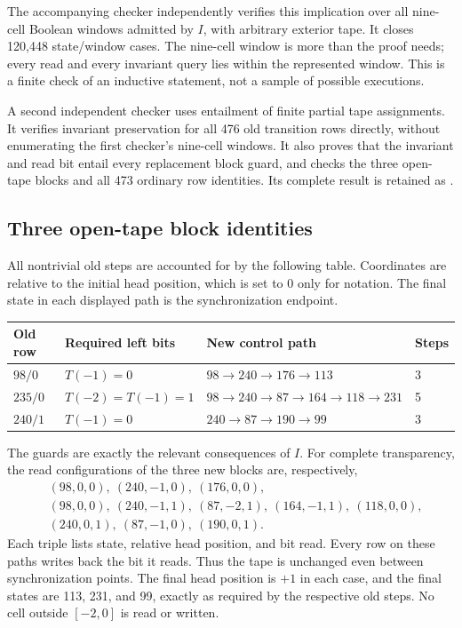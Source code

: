 The accompanying checker independently verifies this implication over all
nine-cell Boolean windows admitted by $I$, with arbitrary exterior tape.
It closes 120,448 state/window cases.  The nine-cell window is more than the
proof needs; every read and every invariant query lies within the represented
window.  This is a finite check of an inductive statement, not a sample of
possible executions.

A second independent checker uses entailment of finite partial tape
assignments.  It verifies invariant preservation for all 476 old transition
rows directly, without enumerating the first checker's nine-cell windows.
It also proves that the invariant and read bit entail every replacement
block guard, and checks the three open-tape blocks and all 473 ordinary
row identities.  Its complete result is retained as
.

\subsection{Three open-tape block identities}

All nontrivial old steps are accounted for by the following table.  Coordinates
are relative to the initial head position, which is set to 0 only for notation.
The final state in each displayed path is the synchronization endpoint.
\begin{center}
\begin{tabular}{@{}llll@{}}
\toprule
Old row & Required left bits & New control path & Steps\\
\midrule
$98/0$ & $T(-1)=0$
 & $98\to240\to176\to113$ & 3\\
$235/0$ & $T(-2)=T(-1)=1$
 & $98\to240\to87\to164\to118\to231$ & 5\\
$240/1$ & $T(-1)=0$
 & $240\to87\to190\to99$ & 3\\
\bottomrule
\end{tabular}
\end{center}
The guards are exactly the relevant consequences of $I$.
For complete transparency, the read configurations of the three new blocks
are, respectively,
\begin{align*}
 &(98,0,0),\ (240,-1,0),\ (176,0,0),\\
 &(98,0,0),\ (240,-1,1),\ (87,-2,1),\
   (164,-1,1),\ (118,0,0),\\
 &(240,0,1),\ (87,-1,0),\ (190,0,1).
\end{align*}
Each triple lists state, relative head position, and bit read.  Every row
on these paths writes back the bit it reads.  Thus the tape is unchanged
even between synchronization points.  The final head position is $+1$ in
each case, and the final states are 113, 231, and 99, exactly as required
by the respective old steps.  No cell outside $[-2,0]$ is read or written.

